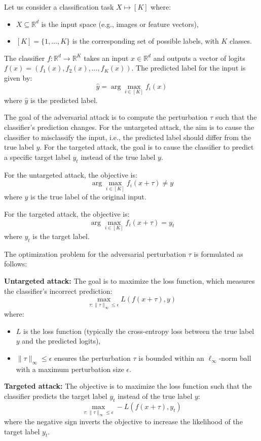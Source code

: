 Let us consider a classification task \( X \mapsto [K] \) where:
\begin{itemize}
    \item \( X \subseteq \mathbb{R}^d \) is the input space (e.g., images or feature vectors),
    \item \( [K] = \{1, ..., K\} \) is the corresponding set of possible labels, with \( K \) classes.
\end{itemize}

The classifier \( f : \mathbb{R}^d \to \mathbb{R}^K \) takes an input \( x \in \mathbb{R}^d \) and outputs a vector of logits \( f(x) = (f_1(x), f_2(x), \dots, f_K(x)) \). The predicted label for the input is given by:
\[
\hat{y} = \arg \max_{i \in [K]} f_i(x)
\]
where \( \hat{y} \) is the predicted label.

The goal of the adversarial attack is to compute the perturbation \( \tau \) such that the classifier's prediction changes. For the untargeted attack, the aim is to cause the classifier to misclassify the input, i.e., the predicted label should differ from the true label \( y \). For the targeted attack, the goal is to cause the classifier to predict a specific target label \( y_t \) instead of the true label \( y \).

For the untargeted attack, the objective is:
\[
\arg \max_{i \in [K]} f_i(x + \tau) \neq y
\]
where \( y \) is the true label of the original input.

For the targeted attack, the objective is:
\[
\arg \max_{i \in [K]} f_i(x + \tau) = y_t
\]
where \( y_t \) is the target label.

The optimization problem for the adversarial perturbation \( \tau \) is formulated as follows:

\textbf{Untargeted attack:} The goal is to maximize the loss function, which measures the classifier's incorrect prediction:
\[
\max_{\tau: \|\tau\|_\infty \leq \epsilon} L(f(x + \tau), y)
\]
where:
\begin{itemize}
    \item \( L \) is the loss function (typically the cross-entropy loss between the true label \( y \) and the predicted logits),
    \item \( \|\tau\|_\infty \leq \epsilon \) ensures the perturbation \( \tau \) is bounded within an \( \ell_\infty \)-norm ball with a maximum perturbation size \( \epsilon \).
\end{itemize}

\textbf{Targeted attack:} The objective is to maximize the loss function such that the classifier predicts the target label \( y_t \) instead of the true label \( y \):
\[
\max_{\tau: \|\tau\|_\infty \leq \epsilon} -L(f(x + \tau), y_t)
\]
where the negative sign inverts the objective to increase the likelihood of the target label \( y_t \).


